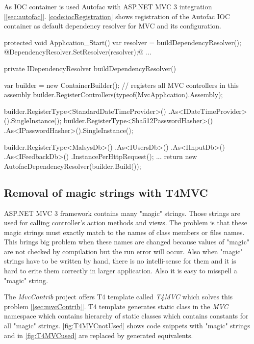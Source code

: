 As IOC container is used Autofac with ASP.NET MVC 3 integration [\ref{sec:autofac}].
\autoref{code:iocRegistration} shows registration of the Autofac IOC container as default dependency resolver for MVC and its configuration.

\begin{Csharp}[label=code:iocRegistration,caption={Registration of dependency container and its configuration}]
protected void Application_Start() {
	var resolver = buildDependencyResolver();
	@DependencyResolver.SetResolver(resolver);@
	...
}

private IDependencyResolver buildDependencyResolver() {
	var builder = new ContainerBuilder();
	// registers all MVC controllers in this assembly
	builder.RegisterControllers(typeof(MvcApplication).Assembly);
	
	builder.RegisterType<StandardDateTimeProvider>()
		.As<IDateTimeProvider>().SingleInstance();
	builder.RegisterType<Sha512PasswordHasher>()
		.As<IPasswordHasher>().SingleInstance();

	builder.RegisterType<MalsysDb>()
		.As<IUsersDb>()
		.As<IInputDb>()
		.As<IFeedbackDb>()
		.InstancePerHttpRequest();
	...
	return new AutofacDependencyResolver(builder.Build());
}
\end{Csharp}


\subsection{Removal of magic strings with T4MVC}

ASP.NET MVC 3 framework contains many "magic" strings.
Those strings are used for calling controller's action methods and views.
The problem is that these magic strings must exactly match to the names of class members or files names.
This brings big problem when these names are changed because values of "magic" are not checked by compilation but the run error will occur.
Also when "magic" strings have to be written by hand, there is no intelli-sense for them and it is hard to erite them correctly in larger application.
Also it is easy to misspell a "magic" string.

The \emph{MvcContrib} project offers T4 template called \emph{T4MVC} which solves this problem [\ref{sec:mvcContrib}].
T4 template generates static class in the \emph{MVC} namespace which contains hierarchy of static classes which contains constants for all "magic" strings.
\autoref{fig:T4MVCnotUsed} shows code snippets with "magic" strings and in \autoref{fig:T4MVCused} are replaced by generated equivalents.

